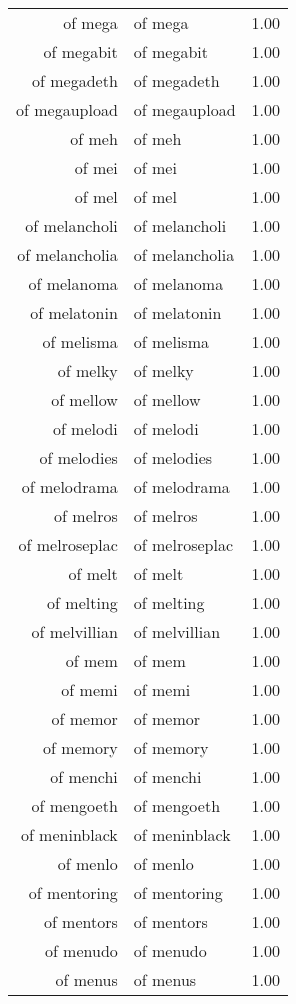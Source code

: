 \begin{table}[ht]
\begin{tabular}{rlr}
  of mega & of mega & 1.00 \\ 
  of megabit & of megabit & 1.00 \\ 
  of megadeth & of megadeth & 1.00 \\ 
  of megaupload & of megaupload & 1.00 \\ 
  of meh & of meh & 1.00 \\ 
  of mei & of mei & 1.00 \\ 
  of mel & of mel & 1.00 \\ 
  of melancholi & of melancholi & 1.00 \\ 
  of melancholia & of melancholia & 1.00 \\ 
  of melanoma & of melanoma & 1.00 \\ 
  of melatonin & of melatonin & 1.00 \\ 
  of melisma & of melisma & 1.00 \\ 
  of melky & of melky & 1.00 \\ 
  of mellow & of mellow & 1.00 \\ 
  of melodi & of melodi & 1.00 \\ 
  of melodies & of melodies & 1.00 \\ 
  of melodrama & of melodrama & 1.00 \\ 
  of melros & of melros & 1.00 \\ 
  of melroseplac & of melroseplac & 1.00 \\ 
  of melt & of melt & 1.00 \\ 
  of melting & of melting & 1.00 \\ 
  of melvillian & of melvillian & 1.00 \\ 
  of mem & of mem & 1.00 \\ 
  of memi & of memi & 1.00 \\ 
  of memor & of memor & 1.00 \\ 
  of memory & of memory & 1.00 \\ 
  of menchi & of menchi & 1.00 \\ 
  of mengoeth & of mengoeth & 1.00 \\ 
  of meninblack & of meninblack & 1.00 \\ 
  of menlo & of menlo & 1.00 \\ 
  of mentoring & of mentoring & 1.00 \\ 
  of mentors & of mentors & 1.00 \\ 
  of menudo & of menudo & 1.00 \\ 
  of menus & of menus & 1.00 \\ 

\end{tabular}
\end{table}
